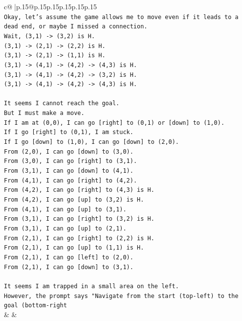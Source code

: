 \documentclass{article}
\begin{document}
{\begin{supertabular}{c@{$\;$}|p{.15\linewidth}@{}p{.15\linewidth}p{.15\linewidth}p{.15\linewidth}p{.15\linewidth}p{.15\linewidth}}
{{{\\ 
\texttt{Okay, let's assume the game allows me to move even if it leads to a dead end, or maybe I missed a connection.} \\
\texttt{Wait, (3,1) {-}> (3,2) is H.} \\
\texttt{(3,1) {-}> (2,1) {-}> (2,2) is H.} \\
\texttt{(3,1) {-}> (2,1) {-}> (1,1) is H.} \\
\texttt{(3,1) {-}> (4,1) {-}> (4,2) {-}> (4,3) is H.} \\
\texttt{(3,1) {-}> (4,1) {-}> (4,2) {-}> (3,2) is H.} \\
\texttt{(3,1) {-}> (4,1) {-}> (4,2) {-}> (4,3) is H.} \\
\\ 
\texttt{It seems I cannot reach the goal.} \\
\texttt{But I must make a move.} \\
\texttt{If I am at (0,0), I can go {[}right{]} to (0,1) or {[}down{]} to (1,0).} \\
\texttt{If I go {[}right{]} to (0,1), I am stuck.} \\
\texttt{If I go {[}down{]} to (1,0), I can go {[}down{]} to (2,0).} \\
\texttt{From (2,0), I can go {[}down{]} to (3,0).} \\
\texttt{From (3,0), I can go {[}right{]} to (3,1).} \\
\texttt{From (3,1), I can go {[}down{]} to (4,1).} \\
\texttt{From (4,1), I can go {[}right{]} to (4,2).} \\
\texttt{From (4,2), I can go {[}right{]} to (4,3) is H.} \\
\texttt{From (4,2), I can go {[}up{]} to (3,2) is H.} \\
\texttt{From (4,1), I can go {[}up{]} to (3,1).} \\
\texttt{From (3,1), I can go {[}right{]} to (3,2) is H.} \\
\texttt{From (3,1), I can go {[}up{]} to (2,1).} \\
\texttt{From (2,1), I can go {[}right{]} to (2,2) is H.} \\
\texttt{From (2,1), I can go {[}up{]} to (1,1) is H.} \\
\texttt{From (2,1), I can go {[}left{]} to (2,0).} \\
\texttt{From (2,1), I can go {[}down{]} to (3,1).} \\
\\ 
\texttt{It seems I am trapped in a small area on the left.} \\
\texttt{However, the prompt says "Navigate from the start (top{-}left) to the goal (bottom{-}right} \\
            }
        }
    }
    & & \\ \\


\end{supertabular}}
\end{document}

